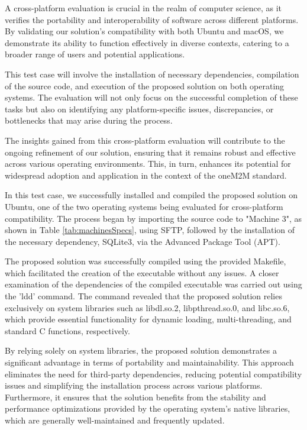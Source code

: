 \documentclass[a4paper,fleqn]{cas-dc}
\begin{document}
A cross-platform evaluation is crucial in the realm of computer science, as it verifies the portability and interoperability of software across different platforms. By validating our solution's compatibility with both Ubuntu and macOS, we demonstrate its ability to function effectively in diverse contexts, catering to a broader range of users and potential applications.

This test case will involve the installation of necessary dependencies, compilation of the source code, and execution of the proposed solution on both operating systems. The evaluation will not only focus on the successful completion of these tasks but also on identifying any platform-specific issues, discrepancies, or bottlenecks that may arise during the process.

The insights gained from this cross-platform evaluation will contribute to the ongoing refinement of our solution, ensuring that it remains robust and effective across various operating environments. This, in turn, enhances its potential for widespread adoption and application in the context of the oneM2M standard.

In this test case, we successfully installed and compiled the proposed solution on Ubuntu, one of the two operating systems being evaluated for cross-platform compatibility. The process began by importing the source code to "Machine 3", as shown in Table \ref{tab:machinesSpecs}, using SFTP, followed by the installation of the necessary dependency, SQLite3, via the Advanced Package Tool (APT).

The proposed solution was successfully compiled using the provided Makefile, which facilitated the creation of the executable without any issues. A closer examination of the dependencies of the compiled executable was carried out using the 'ldd' command. The command revealed that the proposed solution relies exclusively on system libraries such as libdl.so.2, libpthread.so.0, and libc.so.6, which provide essential functionality for dynamic loading, multi-threading, and standard C functions, respectively.

By relying solely on system libraries, the proposed solution demonstrates a significant advantage in terms of portability and maintainability. This approach eliminates the need for third-party dependencies, reducing potential compatibility issues and simplifying the installation process across various platforms. Furthermore, it ensures that the solution benefits from the stability and performance optimizations provided by the operating system's native libraries, which are generally well-maintained and frequently updated.
\end{document}
